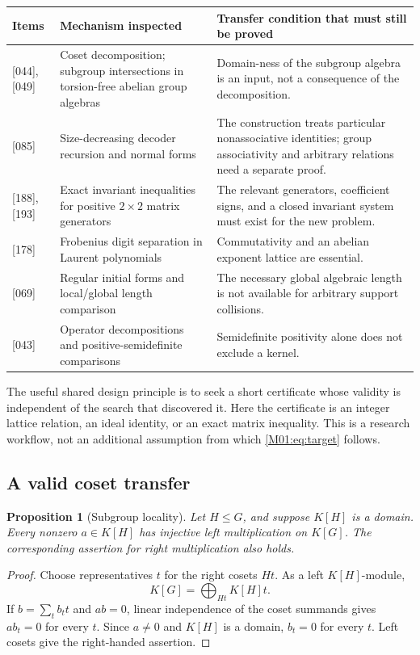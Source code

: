 \documentclass[11pt,a4paper,oneside]{report}
\newtheorem{proposition}[theorem]{Proposition}
\theoremstyle{definition}
\theoremstyle{remark}
\begin{document}
\begin{center}
\small
\begin{tabularx}{\linewidth}{@{}P{19mm}P{42mm}Y@{}}
\toprule
Items & Mechanism inspected & Transfer condition that must still be proved\\
\midrule
{[044], [049]} & Coset decomposition; subgroup intersections in torsion-free abelian group algebras & Domain-ness of the subgroup algebra is an input, not a consequence of the decomposition.\\
{[085]} & Size-decreasing decoder recursion and normal forms & The construction treats particular nonassociative identities; group associativity and arbitrary relations need a separate proof.\\
{[188], [193]} & Exact invariant inequalities for positive $2\times2$ matrix generators & The relevant generators, coefficient signs, and a closed invariant system must exist for the new problem.\\
{[178]} & Frobenius digit separation in Laurent polynomials & Commutativity and an abelian exponent lattice are essential.\\
{[069]} & Regular initial forms and local/global length comparison & The necessary global algebraic length is not available for arbitrary support collisions.\\
{[043]} & Operator decompositions and positive-semidefinite comparisons & Semidefinite positivity alone does not exclude a kernel.\\
\bottomrule
\end{tabularx}
\end{center}

The useful shared design principle is to seek a short certificate whose
validity is independent of the search that discovered it. Here the
certificate is an integer lattice relation, an ideal identity, or an exact
matrix inequality. This is a research workflow, not an additional
assumption from which \eqref{M01:eq:target} follows.

\subsection{A valid coset transfer}

\begin{proposition}[Subgroup locality]\label{M01:prop:locality}
Let $H\le G$, and suppose $K[H]$ is a domain. Every nonzero
$a\in K[H]$ has injective left multiplication on $K[G]$.
The corresponding assertion for right multiplication also holds.
\end{proposition}
\begin{proof}
Choose representatives $t$ for the right cosets $Ht$. As a left
$K[H]$-module,
\[
K[G]=\bigoplus_{Ht}K[H]t.
\]
If $b=\sum_t b_t t$ and $ab=0$, linear independence of the coset summands
gives $ab_t=0$ for every $t$. Since $a\ne0$ and $K[H]$ is a domain,
$b_t=0$ for every $t$. Left cosets give the right-handed assertion.
\end{proof}
\end{document}
